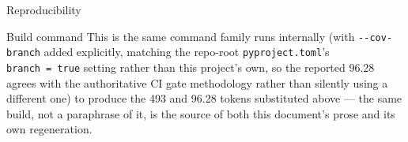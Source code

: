 \documentclass[
  ignorenonframetext,
]{beamer}
\begin{document}
\begin{frame}{Reproducibility}
\begin{block}{Build command}
This is the same command family  runs
internally (with \texttt{-\/-cov-branch} added explicitly, matching the
repo-root \texttt{pyproject.toml}'s \texttt{branch\ =\ true} setting
rather than this project's own, so the reported 96.28 agrees with the
authoritative CI gate methodology rather than silently using a different
one) to produce the 493 and 96.28 tokens substituted above --- the same
build, not a paraphrase of it, is the source of both this document's
prose and its own regeneration.
\end{block}
\end{frame}
\end{document}
